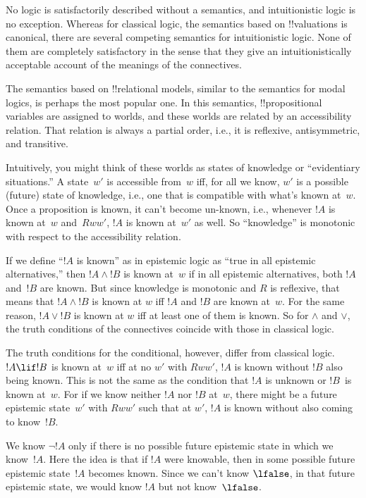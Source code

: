\documentclass[../../../include/open-logic-section]{subfiles}
\begin{document}


No logic is satisfactorily described without a semantics, and
intuitionistic logic is no exception. Whereas for classical logic, the
semantics based on !!{valuation}s is canonical, there are several
competing semantics for intuitionistic logic. None of them are
completely satisfactory in the sense that they give an
intuitionistically acceptable account of the meanings of the
connectives.

The semantics based on !!{relational model}s, similar to the semantics
for modal logics, is perhaps the most popular one.  In this semantics,
!!{propositional variable}s are assigned to worlds, and these worlds
are related by an accessibility relation. That relation is always a
partial order, i.e., it is reflexive, antisymmetric, and
transitive.

Intuitively, you might think of these worlds as states of knowledge or
``evidentiary situations.''  A state~$w'$ is accessible from~$w$ iff,
for all we know, $w'$ is a possible (future) state of knowledge, i.e.,
one that is compatible with what's known at~$w$.  Once a proposition
is known, it can't become un-known, i.e., whenever $!A$ is known at~$w$
and~$Rww'$, $!A$ is known at~$w'$ as well. So ``knowledge'' is
monotonic with respect to the accessibility relation.

If we define ``$!A$ is known'' as in epistemic logic as ``true in all
epistemic alternatives,'' then $!A \land !B$ is known at~$w$ if in all
epistemic alternatives, both $!A$ and~$!B$ are known. But since
knowledge is monotonic and $R$ is reflexive, that means that $!A \land
!B$ is known at $w$ iff $!A$ and $!B$ are known at~$w$.  For the same
reason, $!A \lor !B$ is known at $w$ iff at least one of them is
known. So for $\land$ and $\lor$, the truth conditions of the
connectives coincide with those in classical logic.

The truth conditions for the conditional, however, differ from
classical logic. $!A \lif !B$ is known at~$w$ iff at no $w'$ with
$Rww'$, $!A$ is known without $!B$ also being known. This is not the
same as the condition that $!A$ is unknown or $!B$~is known
at~$w$. For if we know neither $!A$ nor $!B$ at~$w$, there might be a
future epistemic state~$w'$ with $Rww'$ such that at $w'$, $!A$ is
known without also coming to know~$!B$.

We know $\lnot !A$ only if there is no possible future epistemic state
in which we know~$!A$. Here the idea is that if $!A$ were knowable,
then in some possible future epistemic state~$!A$ becomes known. Since
we can't know $\lfalse$, in that future epistemic state, we would know
$!A$ but not know~$\lfalse$.
\end{document}
